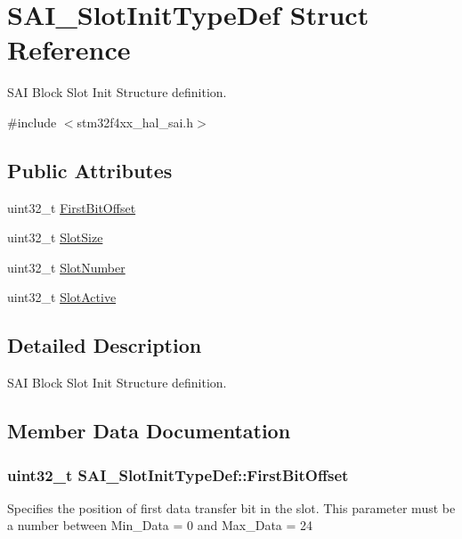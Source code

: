 \hypertarget{struct_s_a_i___slot_init_type_def}{}\section{S\+A\+I\+\_\+\+Slot\+Init\+Type\+Def Struct Reference}
\label{struct_s_a_i___slot_init_type_def}


S\+AI Block Slot Init Structure definition.  




{\ttfamily \#include $<$stm32f4xx\+\_\+hal\+\_\+sai.\+h$>$}

\subsection*{Public Attributes}
\begin{DoxyCompactItemize}
\item 
uint32\+\_\+t \hyperlink{struct_s_a_i___slot_init_type_def_ad5a6f1864d8ce23f0fc262d362dc4d4e}{First\+Bit\+Offset}
\item 
uint32\+\_\+t \hyperlink{struct_s_a_i___slot_init_type_def_adebc14a2c9d30a8c13d2685bdb22d7af}{Slot\+Size}
\item 
uint32\+\_\+t \hyperlink{struct_s_a_i___slot_init_type_def_a476fd97f54e692d634222720d4d4ad6a}{Slot\+Number}
\item 
uint32\+\_\+t \hyperlink{struct_s_a_i___slot_init_type_def_ab507a029fad3a8a181d87c4d603b9952}{Slot\+Active}
\end{DoxyCompactItemize}


\subsection{Detailed Description}
S\+AI Block Slot Init Structure definition. 

\subsection{Member Data Documentation}
\subsubsection[{\texorpdfstring{First\+Bit\+Offset}{FirstBitOffset}}]{\setlength{\rightskip}{0pt plus 5cm}uint32\+\_\+t S\+A\+I\+\_\+\+Slot\+Init\+Type\+Def\+::\+First\+Bit\+Offset}\hypertarget{struct_s_a_i___slot_init_type_def_ad5a6f1864d8ce23f0fc262d362dc4d4e}{}\label{struct_s_a_i___slot_init_type_def_ad5a6f1864d8ce23f0fc262d362dc4d4e}
Specifies the position of first data transfer bit in the slot. This parameter must be a number between Min\+\_\+\+Data = 0 and Max\+\_\+\+Data = 24 
